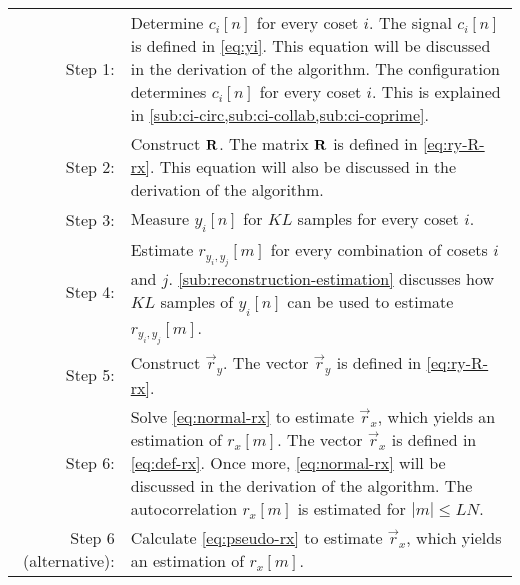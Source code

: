 \documentclass[a4paper, openany, oneside]{memoir}
\begin{document}
\begin{tabularx}{\textwidth}{rY}
    Step 1: & Determine $c_i[n]$ for every coset $i$.
    \newline \newline
    The signal $c_i[n]$ is defined in \cref{eq:yi}. This equation will be discussed in the derivation of the algorithm. The configuration determines $c_i[n]$ for every coset $i$. This is explained in \cref{sub:ci-circ,sub:ci-collab,sub:ci-coprime}.
    \newline \\
    Step 2: & Construct $\boldsymbol{\mathbf{R}}$.
    \newline \newline
    The matrix $\boldsymbol{\mathbf{R}}$ is defined in \cref{eq:ry-R-rx}. This equation will also be discussed in the derivation of the algorithm.
    \newline \\
    Step 3: & Measure $y_i[n]$ for $KL$ samples for every coset $i$. \newline \\
    Step 4: & Estimate $r_{y_i,y_j}[m]$ for every combination of cosets $i$ and $j$.
    \newline \newline
    \cref{sub:reconstruction-estimation} discusses how $KL$ samples of $y_i[n]$ can be used to estimate $r_{y_i,y_j}[m]$.
    \newline \\
    Step 5: & Construct $\vec{r}_y$.
    \newline \newline
    The vector $\vec{r}_y$ is defined in \cref{eq:ry-R-rx}.
    \newline \\
    Step 6: &  Solve \cref{eq:normal-rx} to estimate $\vec{r}_x$, which yields an estimation of $r_x[m]$.
    \newline \newline
    The vector  $\vec{r}_x$ is defined in \cref{eq:def-rx}. Once more, \cref{eq:normal-rx} will be discussed in the derivation of the algorithm. The autocorrelation $r_x[m]$ is estimated for $|m| \le LN$.
    \newline \\
    Step 6 (alternative): & Calculate \cref{eq:pseudo-rx} to estimate $\vec{r}_x$, which yields an estimation of $r_x[m]$.
\end{tabularx}
\end{document}
